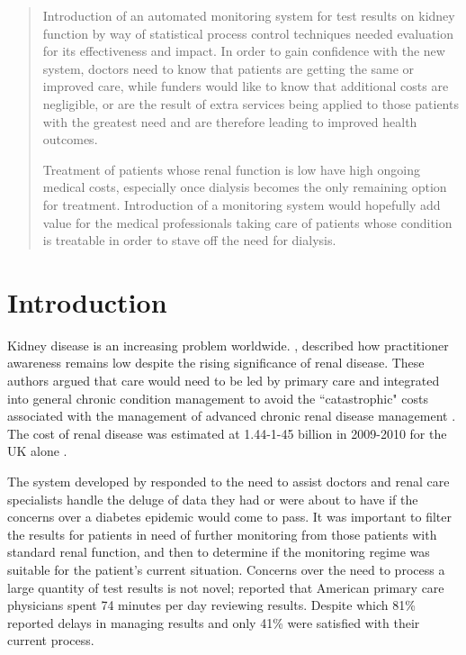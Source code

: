 
\begin{abstract}
Introduction of an automated  monitoring  system for test results on kidney function by way of statistical process control techniques needed evaluation for its effectiveness and impact. In order to gain confidence with the new system, doctors need to know that patients are getting the same or improved care, while funders would like to know that  additional costs are negligible, or are the result of extra services being applied to those patients with the greatest need and are therefore leading to improved health outcomes.

Treatment of patients whose renal function is low have high ongoing medical costs, especially once dialysis becomes the only remaining option for treatment. Introduction of a monitoring system would hopefully add value for the medical professionals taking care of patients whose condition is treatable in order to stave off the need for dialysis.
\end{abstract}

\pagebreak

\section{Introduction}

Kidney disease is an increasing problem worldwide. \citet{jha2013chronic}, described how practitioner awareness remains low despite the rising significance of renal disease. These authors argued that care would need to be led by primary care and integrated into general chronic condition management to avoid the ``catastrophic" costs associated with the management of advanced chronic renal disease management \citep{jha2013chronic}. 
The cost of renal disease was estimated  at 1.44-1-45 billion in 2009-2010 for the UK alone \citep{kerr2012estimating}. 


The system developed by \citet{GodfreyEtAl2014KidneyPaper} responded to the need to assist doctors and renal care specialists handle the deluge of data they had or were about to have if the concerns over a diabetes epidemic would come to pass. It was important to filter the results for patients in need of further monitoring from those patients with standard renal function, and then to determine if the monitoring regime was suitable for the patient's current situation. Concerns over the need to process a large quantity of test results is not novel; \citet{poon2004wish} reported that American primary care physicians spent 74 minutes per day reviewing results. Despite which 81\% reported delays in managing results and only 41\% were satisfied with their current process.

